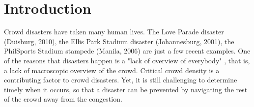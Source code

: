 \documentclass[10pt,a4paper]{article}
\begin{document}
\begin{abstract}

\end{abstract}

\section{Introduction}


Crowd disasters have taken many human lives. The Love Parade disaster (Duisburg, 2010), the Ellis Park Stadium disaster (Johannesburg, 2001), the PhilSports Stadium stampede (Manila, 2006) are just a few recent examples. One of the reasons that disasters happen is a "lack of overview of everybody" \cite{Helbing2012}, that is, a lack of macroscopic overview of the crowd. Critical crowd density  \cite{Helbing2012, density} is a contributing factor to crowd disasters. Yet, it is still challenging to determine timely when it occurs, so that a disaster can be prevented by navigating the rest of the crowd away from the congestion. 
\end{document}
